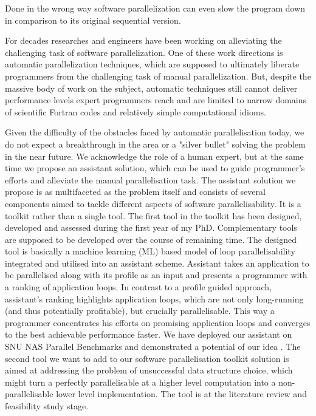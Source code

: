 Done in the wrong way software parallelization can even slow the program down in comparison to its original sequential version. 
 
 For decades researches and engineers have been working on alleviating the challenging task of software parallelization. One of these work directions is automatic parallelization techniques, which are supposed to ultimately liberate programmers from the challenging task of manual parallelization. But, despite the massive body of work on the subject, automatic techniques still cannot deliver performance levels expert programmers reach and are limited to narrow domains of scientific Fortran codes and relatively simple computational idioms.\newline\null
 
\quad Given the difficulty of the obstacles faced by automatic parallelisation today, we do not expect a breakthrough in the area or a "silver bullet" solving the problem in the near future. We acknowledge the role of a human expert, but at the same time we propose an assistant solution, which can be used to guide programmer's efforts and alleviate the manual parallelisation task.\newline\null
\quad The assistant solution we propose is as multifaceted as the problem itself and consists of several components aimed to tackle different aspects of software parallelisability. It is a toolkit rather than a single tool. The first tool in the toolkit has been designed, developed and assessed during the first year of my PhD. Complementary tools are supposed to be developed over the course of remaining time.\newline\null
\quad The designed tool is basically a machine learning (ML) based model of loop parallelisability integrated and utilised into an assistant scheme. Assistant takes an application to be parallelised along with its profile as an input and presents a programmer with a ranking of application loops. In contrast to a profile guided approach, assistant's ranking highlights application loops, which are not only long-running (and thus potentially profitable), but crucially parallelisable. This way a programmer concentrates his efforts on promising application loops and converges to the best achievable performance faster. We have deployed our assistant on SNU NAS Parallel Benchmarks \cite{snu-npb-benchmarks} \cite{nasa-parallel-benchmarks} and demonstrated a potential of our idea \cite{aiseps}.\newline\null
\quad The second tool we want to add to our software parallelisation toolkit solution is aimed at addressing the problem of unsuccessful data structure choice, which might turn a perfectly parallelisable at a higher level computation into a non-parallelisable lower level implementation. The tool is at the literature review and feasibility study stage.







